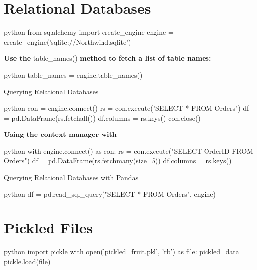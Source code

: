 \section{Relational Databases}

\begin{myblock}{}
\begin{myblock}{}
\begin{codebox}{python}{}
from sqlalchemy import create_engine
engine = create_engine('sqlite://Northwind.sqlite')
\end{codebox}
\textbf{Use the }table\_names() \textbf{ method to fetch a list of table names:}
\begin{codebox}{python}{}
table_names = engine.table_names()
\end{codebox}
\end{myblock}

\begin{myblock}{Querying Relational Databases}
\begin{codebox}{python}{}
con = engine.connect()
rs = con.execute("SELECT * FROM Orders")
df = pd.DataFrame(rs.fetchall())
df.columns = rs.keys()
con.close()
\end{codebox}
\textbf{Using the context manager with}
\begin{codebox}{python}{}
with engine.connect() as con:
    rs = con.execute("SELECT OrderID FROM Orders")
    df = pd.DataFrame(rs.fetchmany(size=5))
    df.columns = rs.keys()
\end{codebox}
\end{myblock}

\begin{myblock}{Querying Relational Databases with Pandas}
\begin{codebox}{python}{}
df = pd.read_sql_query("SELECT * FROM Orders", engine)
\end{codebox}
\end{myblock}
\end{myblock}


\section{Pickled Files}

\begin{codebox}{python}{}
import pickle
with open('pickled_fruit.pkl', 'rb') as file:
    pickled_data = pickle.load(file)
\end{codebox}


